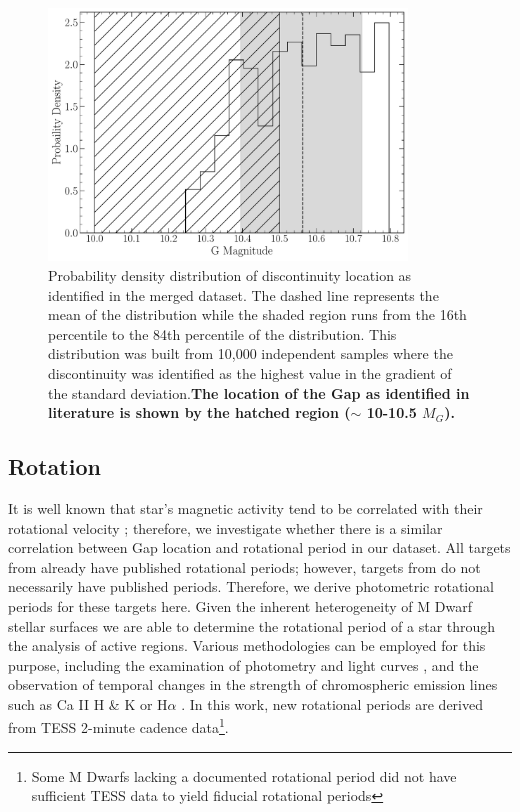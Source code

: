 \begin{figure}
  \centering
  \includegraphics[width=0.85\textwidth]{figures/jaoMagActivity/GapLocationMC.pdf}
  \caption{Probability density distribution of discontinuity location as
  identified in the merged dataset. The dashed line represents the mean of the
  distribution while the shaded region runs from the 16th percentile to the
  84th percentile of the distribution. This distribution was built from 10,000
  independent samples where the discontinuity was identified as the highest
  value in the gradient of the standard deviation.\textbf{The location of the Gap
  as identified in literature is shown by the hatched region ($\sim$ 10-10.5 $M_{G}$).}}
  \label{fig:GapLocationMC}
\end{figure}

\subsection{Rotation}
It is well known that star's magnetic activity tend to be correlated with their
rotational velocity \citep{Vaughan1981, Newton2016, Astudillo-Defru2017,
Houdebine2017, Boudreaux2022}; therefore, we investigate whether there is a
similar correlation between Gap location and rotational period in our dataset.
All targets from \citet{Boudreaux2022} already have published rotational
periods; however, targets from \citet{Perdelwitz2021} do not necessarily have
published periods. Therefore, we derive photometric rotational periods for
these targets here. Given the inherent heterogeneity of M Dwarf stellar
surfaces \citep{Boisse2011, Robertson2020} we are able to determine the
rotational period of a star through the analysis of active regions. Various
methodologies can be employed for this purpose, including the examination of
photometry and light curves \citep[e.g.,][]{Newton2016}, and the observation of
temporal changes in the strength of chromospheric emission lines such as Ca II
H \& K or H$\alpha$ \citep[e.g.,][]{2019A&A...623A..24F,2023MNRAS.518.3147K}.
In this work, new rotational periods are derived from TESS 2-minute cadence
data\footnote{Some M Dwarfs lacking a documented rotational period did not have
sufficient TESS data to yield fiducial rotational periods}.

